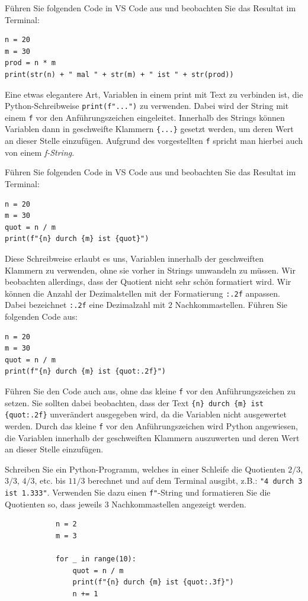 \begin{myexample} Führen Sie folgenden Code in VS Code aus und beobachten Sie das Resultat im Terminal:
\begin{lstlisting}[numbers=none]
n = 20
m = 30
prod = n * m
print(str(n) + " mal " + str(m) + " ist " + str(prod))
\end{lstlisting}
\end{myexample}

Eine etwas elegantere Art, Variablen in einem print mit Text zu verbinden ist, die Python-Schreibweise \lstinline|print(f"...")| zu verwenden. Dabei wird der String mit einem \lstinline|f| vor den Anführungszeichen eingeleitet. Innerhalb des Strings können Variablen dann in geschweifte Klammern \lstinline|{...}| gesetzt werden, um deren Wert an dieser Stelle einzufügen. Aufgrund des vorgestellten \lstinline|f| spricht man hierbei auch von einem \emph{f-String}.

\begin{myexample}
Führen Sie folgenden Code in VS Code aus und beobachten Sie das Resultat im Terminal:
\begin{lstlisting}[numbers=none]
n = 20
m = 30
quot = n / m
print(f"{n} durch {m} ist {quot}")
\end{lstlisting}
Diese Schreibweise erlaubt es uns, Variablen innerhalb der geschweiften Klammern zu verwenden, ohne sie vorher in Strings umwandeln zu müssen. Wir beobachten allerdings, dass der Quotient nicht sehr schön formatiert wird. Wir können die Anzahl der Dezimalstellen mit der Formatierung \lstinline|:.2f| anpassen. Dabei bezeichnet \lstinline|:.2f| eine Dezimalzahl mit 2 Nachkommastellen. Führen Sie folgenden Code aus:
\begin{lstlisting}[numbers=none]
n = 20
m = 30
quot = n / m
print(f"{n} durch {m} ist {quot:.2f}")
\end{lstlisting}
Führen Sie den Code auch aus, ohne das kleine \lstinline|f| vor den Anführungszeichen zu setzen. Sie sollten dabei beobachten, dass der Text \lstinline|{n} durch {m} ist {quot:.2f}| unverändert ausgegeben wird, da die Variablen nicht ausgewertet werden. Durch das kleine \lstinline|f| vor den Anführungszeichen wird Python angewiesen, die Variablen innerhalb der geschweiften Klammern auszuwerten und deren Wert an dieser Stelle einzufügen.
\end{myexample}

\begin{myexercise}
	Schreiben Sie ein Python-Programm, welches in einer Schleife die Quotienten $2/3$, $3/3$, $4/3$, etc. bis $11/3$ berechnet und auf dem Terminal ausgibt, z.B.: \lstinline|"4 durch 3 ist 1.333"|. Verwenden Sie dazu einen \lstinline|f"|-String und formatieren Sie die Quotienten so, dass jeweils 3 Nachkommastellen angezeigt werden.
	\begin{myanswer}
		\begin{lstlisting}
			n = 2
			m = 3

			for _ in range(10):
				quot = n / m
				print(f"{n} durch {m} ist {quot:.3f}")
				n += 1
		\end{lstlisting}
	\end{myanswer}
\end{myexercise}

